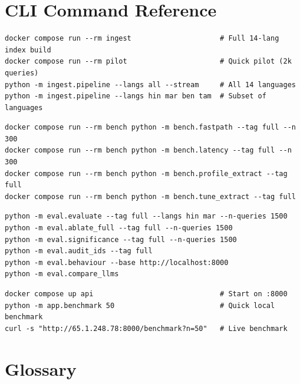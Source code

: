 \documentclass[12pt,a4paper]{article}
\begin{document}
\appendix

\section{CLI Command Reference}

\begin{lstlisting}[style=bashstyle, language={}, title={Ingestion Commands}]
docker compose run --rm ingest                     # Full 14-lang index build
docker compose run --rm pilot                      # Quick pilot (2k queries)
python -m ingest.pipeline --langs all --stream     # All 14 languages
python -m ingest.pipeline --langs hin mar ben tam  # Subset of languages
\end{lstlisting}

\begin{lstlisting}[style=bashstyle, language={}, title={Benchmark Commands}]
docker compose run --rm bench python -m bench.fastpath --tag full --n 300
docker compose run --rm bench python -m bench.latency --tag full --n 300
docker compose run --rm bench python -m bench.profile_extract --tag full
docker compose run --rm bench python -m bench.tune_extract --tag full
\end{lstlisting}

\begin{lstlisting}[style=bashstyle, language={}, title={Evaluation Commands}]
python -m eval.evaluate --tag full --langs hin mar --n-queries 1500
python -m eval.ablate_full --tag full --n-queries 1500
python -m eval.significance --tag full --n-queries 1500
python -m eval.audit_ids --tag full
python -m eval.behaviour --base http://localhost:8000
python -m eval.compare_llms
\end{lstlisting}

\begin{lstlisting}[style=bashstyle, language={}, title={Serving Commands}]
docker compose up api                              # Start on :8000
python -m app.benchmark 50                         # Quick local benchmark
curl -s "http://65.1.248.78:8000/benchmark?n=50"   # Live benchmark
\end{lstlisting}


\section{Glossary}
\end{document}
